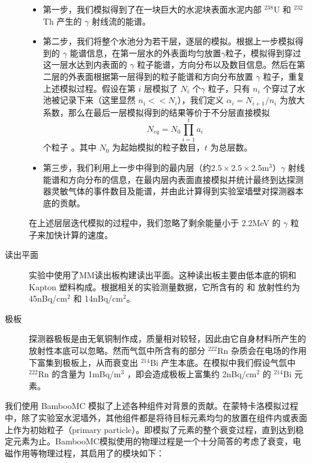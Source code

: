 \begin{description}
    \begin{itemize}
        \item 第一步，我们模拟得到了在一块巨大的水泥块表面水泥内部 $^{238}$U 和 $^{232}$Th 产生的 $\gamma$ 射线流的能谱。
        \item 第二步，我们将整个水池分为若干层，逐层的模拟。根据上一步模拟得到的 $\gamma$ 能谱信息，在第一层水的外表面均匀放置$\gamma$粒子，模拟得到穿过这一层水达到内表面的 $\gamma$ 粒子能谱，方向分布以及数目信息。然后在第二层的外表面根据第一层得到的粒子能谱和方向分布放置 $\gamma$ 粒子，重复上述模拟过程。假设在第 $i$ 层模拟了 $N_i$ 个$\gamma$ 粒子，只有 $n_i$ 个穿过了水池被记录下来（这里显然 $n_i<<N_i$），我们定义 $\alpha_i=N_{i+1}/n_i$ 为放大系数，那么在最后一层模拟得到的结果等价于不分层直接模拟 $$N_{eq}=N_0\prod_{i=1}^{t}a_i$$ 个粒子 。其中 $N_0$ 为起始模拟的粒子数目，$t$ 为总层数。
        \item 第三步，我们利用上一步中得到的最内层（约$2.5\times2.5\times2.5$m$^3$）$\gamma$ 射线能谱和方向分布的信息，在最内层内表面直接模拟并统计最终到达探测器灵敏气体的事件数目及能谱，并由此计算得到实验室墙壁对探测器本底的贡献。
    \end{itemize}
    在上述层层迭代模拟的过程中，我们忽略了剩余能量小于 2.2MeV 的 $\gamma$ 粒子来加快计算的速度。

    \item[读出平面] 实验中使用了MM读出板构建读出平面。这种读出板主要由低本底的铜和 Kapton 塑料构成。根据相关的实验测量数据，它所含有的 \utte 和 \thttt 放射性约为 45nBq/cm$^2$ 和 14nBq/cm$^2$。

    \item[极板] 探测器极板是由无氧铜制作成，质量相对较轻，因此由它自身材料所产生的放射性本底可以忽略。然而气氙中所含有的部分 $^{222}$Rn 杂质会在电场的作用下富集到极板上，从而衰变出 $^{214}$Bi 产生本底。在模拟中我们假设气氙中 $^{222}$Rn 的含量为 1mBq/m$^3$ ，即会造成极板上富集约 2nBq/cm$^2$ 的 $^{214}$Bi 元素。
\end{description}

\vspace{0.4cm}

我们使用 BambooMC 模拟了上述各种组件对背景的贡献。在蒙特卡洛模拟过程中，除了实验室水泥墙外，其他组件都是将待目标元素均匀的放置在组件内或表面上作为初始粒子（primary particle）。即模拟了元素的整个衰变过程，直到达到稳定元素为止。BambooMC模拟使用的物理过程是一个十分简答的考虑了衰变，电磁作用等物理过程，其启用了的模块如下：

